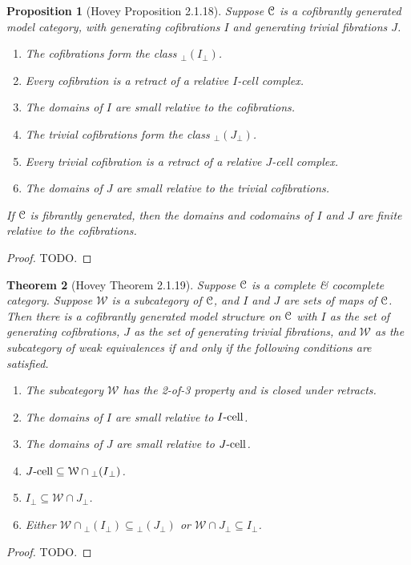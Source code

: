 \documentclass{amsart}
\theoremstyle{plain}
\newtheorem{theorem}{Theorem}[section]
\newtheorem{proposition}[theorem]{Proposition}
\theoremstyle{definition}
\newcommand{\sseq}{\subseteq}
\newcommand{\0}{\mathbf{0}}
\newcommand{\cC}{\mathcal C}
\newcommand{\p}{{_\perp}}
\newcommand{\cW}{\mathcal W}
\renewcommand{\(}{\left(}
\renewcommand{\)}{\right)}
\def\scr{\EuScript}
\def\cC{\scr{C}}
\newcommand{\cell}{\text-\mathrm{cell}}
\begin{document}
\begin{proposition}[Hovey Proposition 2.1.18]\label{2.1.18}
  Suppose $\cC$ is a cofibrantly generated model category, with generating cofibrations $I$ and generating trivial fibrations $J$.\begin{enumerate}[label=(\alph*),noitemsep,topsep=0pt]
    \item The cofibrations form the class ${\p(I\p)}$.
    \item Every cofibration is a retract of a relative $I$-cell complex.
    \item The domains of $I$ are small relative to the cofibrations.
    \item The trivial cofibrations form the class ${\p(J\p)}$.
    \item Every trivial cofibration is a retract of a relative $J$-cell complex.
    \item The domains of $J$ are small relative to the trivial cofibrations.
  \end{enumerate}
  If $\cC$ is fibrantly generated, then the domains and codomains of $I$ and $J$ are finite relative to the cofibrations.
\end{proposition}
\begin{proof}
  \color{red}TODO.
\end{proof}

\begin{theorem}[Hovey Theorem 2.1.19]\label{2.1.19}
  Suppose $\cC$ is a complete \& cocomplete category. Suppose $\cW$ is a subcategory of $\cC$, and $I$ and $J$ are sets of maps of $\cC$. Then there is a cofibrantly generated model structure on $\cC$ with $I$ as the set of generating cofibrations, $J$ as the set of generating trivial fibrations, and $\cW$ as the subcategory of weak equivalences if and only if the following conditions are satisfied.\begin{enumerate}[label=\arabic*.,noitemsep,topsep=0pt]
    \item The subcategory $\cW$ has the 2-of-3 property and is closed under retracts.
    \item The domains of $I$ are small relative to $I\cell$.
    \item The domains of $J$ are small relative to $J\cell$.
    \item $J\cell\sseq\cW\cap {\p(I\p)}$.
    \item $I\p\sseq\cW\cap J\p$.
    \item Either $\cW\cap {\p(I\p)}\sseq {\p(J\p)}$ or $\cW\cap J\p\sseq I\p$.
  \end{enumerate}
\end{theorem}
\begin{proof}
  \color{red}TODO.
\end{proof}
\end{document}
